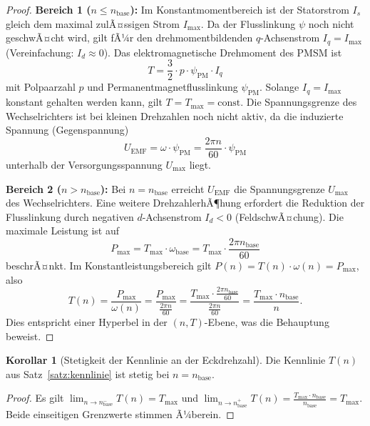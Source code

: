 ﻿\documentclass[a4paper,12pt]{article}
\theoremstyle{definition}
\newtheorem{korollar}{Korollar}
\begin{document}
\begin{proof}
    \textbf{Bereich 1 ($n \leq n_{\mathrm{base}}$):}
    Im Konstantmomentbereich ist der Statorstrom $I_s$ gleich dem maximal zulÃ¤ssigen
    Strom $I_{\max}$. Da der Flusslinkung $\psi$ noch nicht geschwÃ¤cht wird, gilt fÃ¼r den
    drehmomentbildenden $q$-Achsenstrom $I_q = I_{\max}$ (Vereinfachung: $I_d \approx 0$).
    Das elektromagnetische Drehmoment des PMSM ist
    \[
        T = \frac{3}{2} \cdot p \cdot \psi_{\mathrm{PM}} \cdot I_q
    \]
    mit Polpaarzahl $p$ und Permanentmagnetflusslinkung $\psi_{\mathrm{PM}}$.
    Solange $I_q = I_{\max}$ konstant gehalten werden kann, gilt $T = T_{\max} = \mathrm{const}$.
    Die Spannungsgrenze des Wechselrichters ist bei kleinen Drehzahlen noch nicht
    aktiv, da die induzierte Spannung (Gegenspannung)
    \[
        U_{\mathrm{EMF}} = \omega \cdot \psi_{\mathrm{PM}} = \frac{2\pi n}{60} \cdot \psi_{\mathrm{PM}}
    \]
    unterhalb der Versorgungsspannung $U_{\max}$ liegt.

    \textbf{Bereich 2 ($n > n_{\mathrm{base}}$):}
    Bei $n = n_{\mathrm{base}}$ erreicht $U_{\mathrm{EMF}}$ die Spannungsgrenze
    $U_{\max}$ des Wechselrichters. Eine weitere DrehzahlerhÃ¶hung erfordert die
    Reduktion der Flusslinkung durch negativen $d$-Achsenstrom $I_d < 0$
    (FeldschwÃ¤chung). Die maximale Leistung ist auf
    \[
        P_{\max} = T_{\max} \cdot \omega_{\mathrm{base}} = T_{\max} \cdot \frac{2\pi n_{\mathrm{base}}}{60}
    \]
    beschrÃ¤nkt. Im Konstantleistungsbereich gilt $P(n) = T(n) \cdot \omega(n) = P_{\max}$,
    also
    \[
        T(n) = \frac{P_{\max}}{\omega(n)} = \frac{P_{\max}}{\frac{2\pi n}{60}}
             = \frac{T_{\max} \cdot \frac{2\pi n_{\mathrm{base}}}{60}}{\frac{2\pi n}{60}}
             = \frac{T_{\max} \cdot n_{\mathrm{base}}}{n}.
    \]
    Dies entspricht einer Hyperbel in der $(n, T)$-Ebene, was die Behauptung beweist.
\end{proof}

\begin{korollar}[Stetigkeit der Kennlinie an der Eckdrehzahl]
    Die Kennlinie $T(n)$ aus Satz~\ref{satz:kennlinie} ist stetig bei $n = n_{\mathrm{base}}$.
\end{korollar}

\begin{proof}
    Es gilt $\lim_{n \to n_{\mathrm{base}}^-} T(n) = T_{\max}$ und
    $\lim_{n \to n_{\mathrm{base}}^+} T(n) = \frac{T_{\max} \cdot n_{\mathrm{base}}}{n_{\mathrm{base}}} = T_{\max}$.
    Beide einseitigen Grenzwerte stimmen Ã¼berein.
\end{proof}
\end{document}
